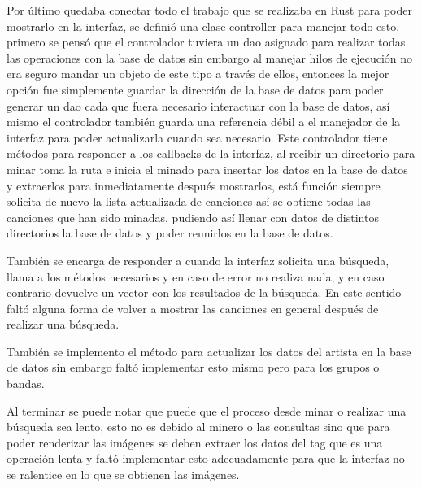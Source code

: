 \documentclass[12pt,a4paper]{article}
\begin{document}
Por último quedaba conectar todo el trabajo que se realizaba en Rust para poder mostrarlo en la interfaz, se definió
una clase controller para manejar todo esto, primero se pensó que el controlador tuviera un dao asignado para realizar todas
las operaciones con la base de datos sin embargo al manejar hilos de ejecución no era seguro mandar un objeto de este tipo a través 
de ellos, entonces la mejor opción fue simplemente guardar la dirección de la base de datos para poder generar un dao cada que fuera
necesario interactuar con la base de datos, así mismo el controlador también guarda una referencia débil a el manejador de la
interfaz para poder actualizarla cuando sea necesario. Este controlador tiene métodos para responder a los callbacks de la interfaz,
al recibir un directorio para minar toma la ruta e inicia el minado para insertar los datos en la base de datos y extraerlos para 
inmediatamente después mostrarlos, está función siempre solicita de nuevo la lista actualizada de canciones así se obtiene todas las canciones
que han sido minadas, pudiendo así llenar con datos de distintos directorios la base de datos y poder reunirlos en la base de datos.

También se encarga de responder a cuando la interfaz solicita una búsqueda, llama a los métodos necesarios y en caso de error no realiza nada,
y en caso contrario devuelve un vector con los resultados de la búsqueda. En este sentido faltó alguna forma de volver a mostrar las canciones en 
general después de realizar una búsqueda.

También se implemento el método para actualizar los datos del artista en la base de datos sin embargo faltó implementar esto mismo 
pero para los grupos o bandas.

Al terminar se puede notar que puede que el proceso desde minar o realizar una búsqueda sea lento, esto no es debido al minero o las consultas 
sino que para poder renderizar las imágenes se deben extraer los datos del tag que es una operación lenta y faltó implementar esto adecuadamente
para que la interfaz no se ralentice en lo que se obtienen las imágenes.
\end{document}
